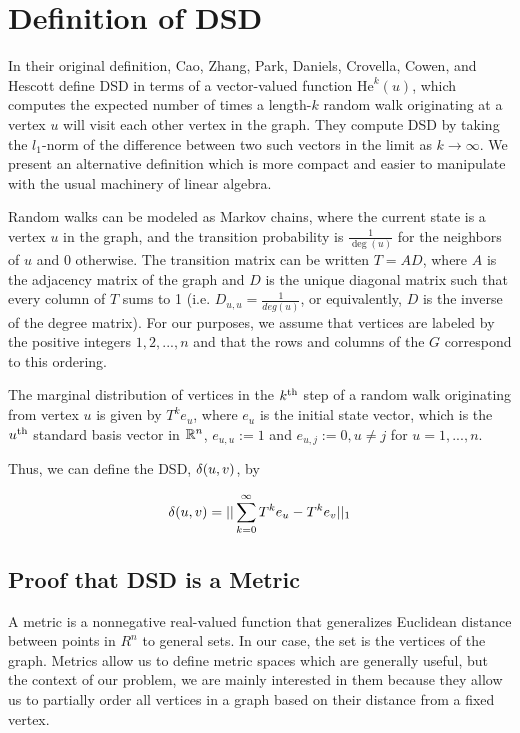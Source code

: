 \section{Definition of DSD}

\noindent In their original definition, Cao, Zhang, Park, Daniels, Crovella, Cowen, and Hescott define
DSD in terms of a vector-valued function $\mathrm{He}^{k}(u)$, which computes the expected number of
times a length-$k$ random walk originating at a vertex $u$ will visit each other vertex in the graph.
They compute DSD by taking the $l_1$-norm of the difference between two such vectors in the limit as
$k \to \infty$. We present an alternative definition which is more compact and easier to manipulate
with the usual machinery of linear algebra.


Random walks can be modeled as Markov chains, where the current state is a
vertex $u$ in the graph, and the transition probability is $\frac{1}{\deg(u)}$
for the neighbors of $u$ and $0$ otherwise. The transition matrix can be written
$T = AD$, where $A$ is the adjacency matrix of the graph and $D$ is the unique
diagonal matrix such that every column of $T$ sums to 1 (i.e.
$D_{u,u}=\frac{1}{deg(u)}$, or equivalently, $D$ is the inverse of the degree
matrix). For our purposes, we assume that vertices are labeled by the positive
integers $1,2,...,n$ and that the rows and columns of the $G$ correspond to this
ordering.

The marginal distribution of vertices in the $k^{\mathrm{th}}$ step of a random walk
originating from vertex $u$ is given by $T^ke_u$, where $e_u$ is the initial
state vector, which is the $u^{\mathrm{th}}$ standard basis vector in $\mathbb{R}^n$,
$e_{u,u} := 1$ and $e_{u,j} := 0, u \neq j$ for $u=1,...,n$.

Thus, we can define the DSD, $\delta(u,v)$, by

\[
  \delta(u,v) = ||\sum_{k =0}^{\infty}{T^ke_u - T^ke_v}||_1
\]

\subsection{Proof that DSD is a Metric}

A metric is a nonnegative real-valued function that generalizes Euclidean
distance between points in $R^n$ to general sets. In our case, the set is the
vertices of the graph. Metrics allow us to define metric spaces which are
generally useful, but the context of our problem, we are mainly interested in
them because they allow us to partially order all vertices in a graph based on
their distance from a fixed vertex.

